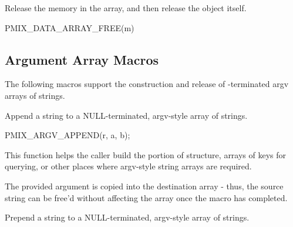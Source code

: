 
Release the memory in the array, and then release the  object itself.

\cspecificstart
\begin{codepar}
PMIX_DATA_ARRAY_FREE(m)
\end{codepar}
\cspecificend

\begin{arglist}
\end{arglist}

\subsection{Argument Array Macros}

The following macros support the construction and release of -terminated argv arrays of strings.


Append a string to a NULL-terminated, argv-style array of strings.

\cspecificstart
\begin{codepar}
PMIX_ARGV_APPEND(r, a, b);
\end{codepar}
\cspecificend

\begin{arglist}
\end{arglist}

This function helps the caller build the  portion of  structure, arrays of keys for querying, or other places where argv-style string arrays are required.

\adviceuserstart
The provided argument is copied into the destination array - thus, the source string can be free'd without affecting the array once the macro has completed.
\adviceuserend


Prepend a string to a NULL-terminated, argv-style array of strings.

